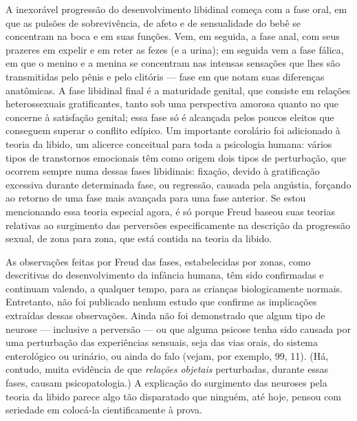  A inexorável progressão do desenvolvimento libidinal começa com a fase
oral,\idxforal{} em que as pulsões de sobrevivência, de afeto e de sensualidade do
bebê se concentram na boca e em suas funções. Vem, em seguida, a fase
anal,\idxfanal{} com seus prazeres em expelir e em reter as fezes (e a urina); em
seguida vem a fase fálica,\idxfasef{} em que o menino e a menina se concentram nas
intensas sensações que lhes são transmitidas pelo pênis e pelo clitóris
--- fase em que notam suas diferenças anatômicas. A fase\idxgenetfase{} libidinal final
é a maturidade genital,\idxconfematu{} que consiste em relações heterossexuais\idxheterofase{}
gratificantes, tanto sob uma perspectiva amorosa quanto no que concerne
à satisfação genital; essa fase só é alcançada pelos poucos eleitos que
conseguem superar o conflito edípico. Um importante corolário foi
adicionado à teoria da libido, um alicerce conceitual para toda a
psicologia humana: vários tipos de transtornos emocionais têm como
origem dois tipos de perturbação, que ocorrem sempre numa dessas fases
libidinais: fixação,\idxlibidfixa{} devido à gratificação excessiva durante
determinada fase, ou regressão, causada pela angústia, forçando ao
retorno de uma fase mais avançada para uma fase anterior. Se estou
mencionando essa teoria especial agora, é só porque Freud baseou suas
teorias relativas ao surgimento das perversões especificamente na
descrição da progressão sexual, de zona para zona, que está contida na
teoria da libido.

 As observações feitas por Freud das fases, estabelecidas por zonas,
como descritivas do desenvolvimento da infância humana, têm sido
confirmadas e continuam valendo, a qualquer tempo, para as crianças
biologicamente normais. Entretanto, não foi publicado nenhum estudo que
confirme as implicações extraídas dessas observações. Ainda não foi
demonstrado que algum tipo de neurose\idxneuro{} --- inclusive a perversão --- ou que
alguma psicose tenha sido causada por uma perturbação das experiências
sensuais, seja das vias orais, do sistema enterológico ou urinário, ou
ainda do falo (vejam, por exemplo, 99, 11). (Há, contudo, muita
evidência de que \textit{relações} \textit{objetais} perturbadas,
durante essas fases, causam psicopatologia.) A explicação do surgimento
das neuroses pela teoria da libido parece algo tão disparatado que
ninguém, até hoje, pensou com seriedade em colocá-la cientificamente à
prova.

